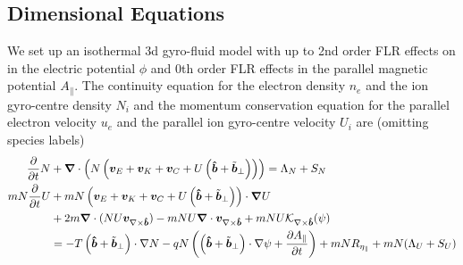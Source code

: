 \subsection{Dimensional Equations}
We set up an isothermal 3d gyro-fluid model with up to 2nd order FLR effects
on in the electric potential $\phi$ and 0th order FLR effects in the parallel magnetic
potential $A_\parallel$.
The continuity equation for the electron density \(n_e\) and the ion gyro-centre
density \(N_i\) and the momentum conservation equation for
the parallel electron velocity \(u_e\) and the parallel ion gyro-centre velocity \(U_i\) are
(omitting species labels)~\cite{WiesenbergerPhD, HeldPhD}
\begin{align}
\frac{\partial}{\partial t} N &+ {\boldsymbol{\nabla}}\cdot\left( N \left(
    {\boldsymbol{v}}_E + {\boldsymbol{v}}_K + {\boldsymbol{v}}_{C} + U\left(\bm{\hat{b}} + \tilde{{\boldsymbol{b}}}_\perp\right)\right)\right) = \Lambda_N + S_N \\
mN \frac{\partial}{\partial t} U &+ mN \left(
    {\boldsymbol{v}}_E + {\boldsymbol{v}}_K + {\boldsymbol{v}}_{C} + U\left(\bm{\hat{b}} + \tilde{{\boldsymbol{b}}}_\perp\right)
    \right)\cdot {\boldsymbol{\nabla}} U  \nonumber \\
    &+ 2m{\boldsymbol{\nabla}} \cdot ( NU {\boldsymbol{v}}_{\nabla\times\bm{\hat{b}}})
    -mNU{\boldsymbol{\nabla}}\cdot {\boldsymbol{v}}_{\nabla\times\bm{\hat{b}}}
    + mNU\mathcal K_{\nabla\times\bm{\hat{b}}}(\psi) \nonumber\\
    &= -T \left(\bm{\hat{b}} + \tilde{{\boldsymbol{b}}}_\perp\right)\cdot \nabla N -qN \left( \left(\bm{\hat{b}}+\tilde{{\boldsymbol{b}}}_\perp\right)\cdot \nabla \psi + \frac{\partial A_\parallel}{\partial t}\right) + mN R_{\eta_\parallel} + mN(\Lambda_U + S_U)
\label{}
\end{align}
